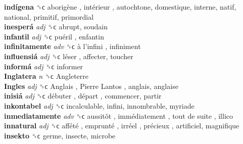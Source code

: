 \textbf{indígena} ␝ϲ   aborigène ,  intérieur , autochtone, domestique, interne, natif, national, primitif, primordial  \\
\textbf{inesperá} \emph{adj}  ␝ϲ  abrupt, soudain  \\
\textbf{infantil} \emph{adj}  ␝ϲ   puéril , enfantin  \\
\textbf{infinitamente} \emph{adv}  ␝ϲ   à l’infini , infiniment  \\
\textbf{influensiá} \emph{adj}  ␝ϲ   léser , affecter, toucher  \\
\textbf{informá} \emph{adj}  ␝ϲ  informer  \\
\textbf{Inglatera} \emph{n}  ␝ϲ   Angleterre   \\
\textbf{Ingles} \emph{adj}  ␝ϲ   Anglais ,  Pierre Lantos , anglais, anglaise  \\
\textbf{inisiá} \emph{adj}  ␝ϲ   débuter ,  départ , commencer, partir  \\
\textbf{inkontabel} \emph{adj}  ␝ϲ  incalculable, infini, innombrable, myriade  \\
\textbf{inmediatamente} \emph{adv}  ␝ϲ   aussitôt ,  immédiatement ,  tout de suite , illico  \\
\textbf{innatural} \emph{adj}  ␝ϲ   affété ,  emprunté ,  irréel ,  précieux , artificiel, magnifique  \\
\textbf{insekto} ␝ϲ  germe, insecte, microbe  \\
